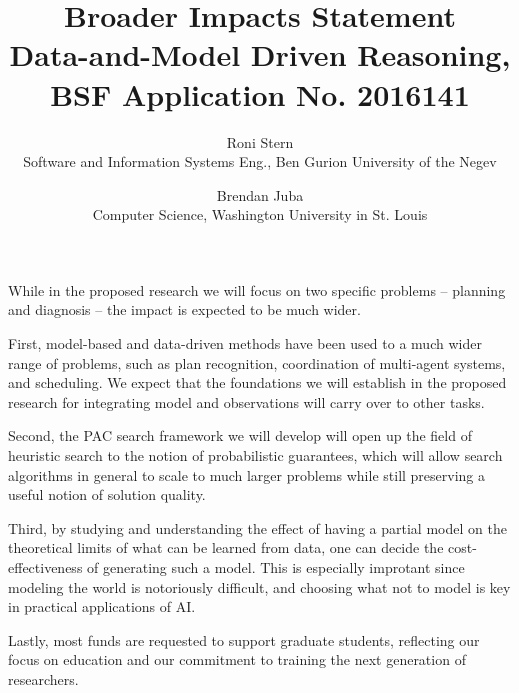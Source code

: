 \documentclass[12pt]{article}
\begin{document}
\title{Broader Impacts Statement \\ \Large{Data-and-Model Driven Reasoning, BSF Application No. 2016141}}
\date{\vspace{-0.5cm}}
\author{Roni Stern \\ Software and Information Systems Eng., Ben Gurion University of the Negev
        \and Brendan Juba \\ Computer Science, Washington University in St. Louis}



\maketitle


While in the proposed research we will focus on two specific problems -- planning and diagnosis -- the impact is expected to be much wider. 

First, model-based and data-driven methods have been used to a much wider range of problems, such as plan recognition, coordination of multi-agent systems, and scheduling. We expect that the foundations we will establish in the proposed research for integrating model and observations will carry over to other tasks. 


Second, the PAC search framework we will develop will open up the field of heuristic search to the notion of probabilistic guarantees, which will allow search algorithms in general to scale to much larger problems while still preserving a useful notion of solution quality. 

Third, by studying and understanding the effect of having a partial model on the theoretical limits of what can be learned from data, one can decide the cost-effectiveness of generating such a model. 
This is especially improtant since modeling the world is notoriously difficult, and choosing what not to model is key in practical applications of AI. 

Lastly, most funds are requested to support graduate students, reflecting our focus on education and our commitment to training the next generation of researchers. 
\end{document}

